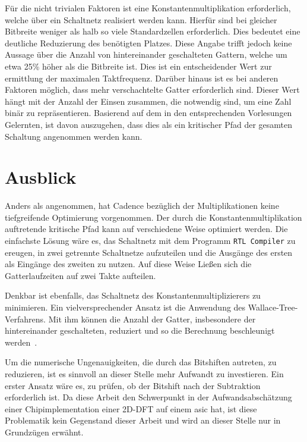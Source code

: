  Für die nicht trivialen Faktoren ist eine Konstantenmultiplikation erforderlich, welche über ein Schaltnetz realisiert werden kann. Hierfür sind bei gleicher Bitbreite weniger
 als halb so viele Standardzellen erforderlich. Dies bedeutet eine deutliche Reduzierung des benötigten Platzes. Diese Angabe trifft jedoch keine Aussage über die 
 Anzahl von hintereinander geschalteten Gattern, welche um etwa 25\% höher als die Bitbreite ist. Dies ist ein entscheidender Wert zur ermittlung der maximalen Taktfrequenz.
 Darüber hinaus ist es bei anderen Faktoren möglich, dass mehr verschachtelte Gatter erforderlich sind. Dieser Wert hängt mit der Anzahl der Einsen zusammen, die notwendig sind,
 um eine Zahl binär zu repräsentieren. Basierend auf dem in den entsprechenden Vorlesungen Gelernten, ist davon auszugehen, dass dies als ein kritischer Pfad der gesamten Schaltung
 angenommen werden kann.
 

 
 \section{Ausblick}
 Anders als angenommen, hat Cadence bezüglich der Multiplikationen keine tiefgreifende Optimierung vorgenommen.
 Der durch die Konstantenmultiplikation auftretende kritische Pfad kann auf verschiedene Weise optimiert werden.
 Die einfachste Lösung wäre es, das Schaltnetz mit dem Programm \texttt{RTL Compiler} zu ereugen, in zwei getrennte Schaltnetze aufzuteilen und die Ausgänge des ersten als Eingänge des zweiten zu nutzen. Auf diese Weise Ließen sich die Gatterlaufzeiten auf zwei Takte aufteilen. 
 
 Denkbar ist ebenfalls, das Schaltnetz des Konstantenmultiplizierers zu minimieren. Ein vielversprechender Ansatz ist die Anwendung des Wallace-Tree-Verfahrens.
 Mit ihm können die Anzahl der Gatter, insbesondere der hintereinander geschalteten, reduziert und so die Berechnung  beschleunigt werden~\autocite[8-10]{jdrechsler2008binMultWerke}.
  
 Um die numerische Ungenauigkeiten, die durch das Bitshiften autreten, zu reduzieren, ist es sinnvoll an dieser Stelle mehr Aufwandt zu investieren. Ein erster Ansatz wäre es, zu prüfen, 
 ob der Bitshift nach der Subtraktion erforderlich ist. Da diese Arbeit den Schwerpunkt in der Aufwandsabschätzung einer Chipimplementation einer 2D-DFT auf einem \gls{asic} hat, ist diese Problematik kein Gegenstand dieser Arbeit und wird an dieser Stelle nur in Grundzügen erwähnt. %
 
 